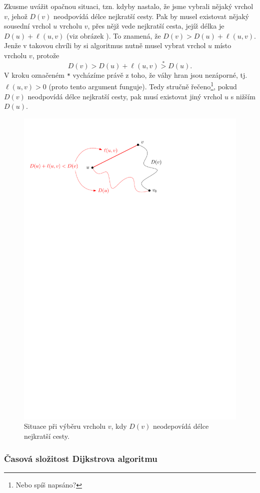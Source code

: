 Zkusme uvážit opačnou situaci, tzn. kdyby nastalo, že jsme vybrali nějaký vrchol $v$, jehož $D(v)$ neodpovídá délce nejkratší cesty. Pak by musel existovat nějaký sousední vrchol $u$ vrcholu $v$, přes nějž vede nejkratší cesta, jejíž délka je $D(u)+\ell(u,v)$ (viz obrázek ). To znamená, že $D(v)>D(u)+\ell(u,v)$. Jenže v takovou chvíli by si algoritmus nutně musel vybrat vrchol $u$ místo vrcholu $v$, protože
\[D(v)>D(u)+\ell(u,v)\stackrel{\texttt{*}}{>}D(u).\]
V kroku označeném \texttt{*} vycházíme právě z toho, že váhy hran jsou nezáporné, tj. $\ell(u,v)>0$ (proto tento argument funguje). Tedy stručně řečeno\footnote{Nebo spíš napsáno?}, pokud $D(v)$ neodpovídá délce nejkratší cesty, pak musí existovat jiný vrchol $u$ s nižším $D(u)$.
\begin{figure}[h]
    \centering
    \includegraphics[scale=\graphimgsize]{components/images/ch01_dijkstra_vyber_vrcholu.pdf}
    \caption{Situace při výběru vrcholu $v$, kdy $D(v)$ neodepovídá délce nejkratší cesty.}
    \label{fig:dijkstra_vyber_vrcholu}
\end{figure}

\subsubsection{Časová složitost Dijkstrova algoritmu}

